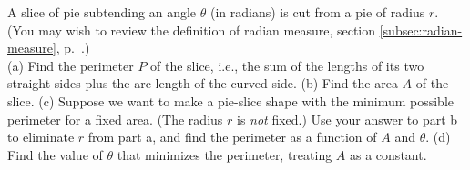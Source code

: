 A slice of pie subtending an angle $\theta$ (in radians) is cut from
a pie of radius $r$. (You may wish to review the definition of radian
measure, section \ref{subsec:radian-measure}, p.~\pageref{subsec:radian-measure}.)\\
(a) Find the perimeter $P$ of the slice, i.e., the sum of
the lengths of its two straight sides plus the arc
length of the curved side.\answercheck\hwendpart
(b) Find the area $A$ of the slice.\answercheck\hwendpart
(c) Suppose we want to make a pie-slice shape with the minimum possible perimeter for a fixed area.
(The radius $r$ is \emph{not} fixed.)
Use your answer to part b to eliminate $r$ from part a, and
find the perimeter as a function of $A$ and $\theta$.\answercheck\hwendpart
(d) Find the value of $\theta$ that minimizes the perimeter, treating $A$ as a constant.\answercheck\hwendpart
